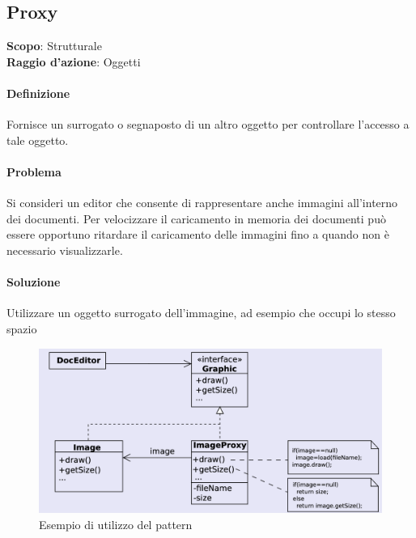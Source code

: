 \subsection{Proxy}
\label{proxy}

\textbf{Scopo}: Strutturale \\
\textbf{Raggio d'azione}: Oggetti

\paragraph{Definizione} Fornisce un surrogato o segnaposto di un altro oggetto per controllare l'accesso a tale oggetto.

\paragraph{Problema} Si consideri un editor che consente di rappresentare anche immagini all’interno dei documenti. Per velocizzare il caricamento in memoria dei documenti può essere opportuno ritardare il caricamento delle immagini fino a quando non è necessario visualizzarle.

\paragraph{Soluzione} Utilizzare un oggetto surrogato dell’immagine, ad esempio che occupi lo stesso spazio

\begin{figure}[H]
    \centering
    \includegraphics[width=1\linewidth]{assets/pattern/proxy/proxy-esempio.png}
    \caption{Esempio di utilizzo del pattern}
\end{figure}

